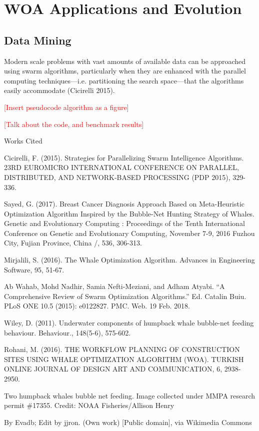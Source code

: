 \documentclass[11pt]{article}
\newcommand{\bibent}{\noindent \hangindent 40pt}
\newenvironment{workscited}{\newpage \begin{center} Works Cited \end{center}}{\newpage }
\newcommand{\TODO}[1]{\textcolor{red}{[#1]}}
\begin{document}
\section*{WOA Applications and Evolution}
\subsection*{Data Mining}
Modern scale problems with vast amounts of available data can be approached using swarm algorithms, particularly when they are enhanced with the parallel computing techniques---i.e. partitioning the search space---that the algorithms easily accommodate (Cicirelli 2015).

\TODO{Insert pseudocode algorithm as a figure}

\TODO{Talk about the code, and benchmark results}


\begin{workscited}

\bibent
Cicirelli, F. (2015). Strategies for Parallelizing Swarm Intelligence Algorithms. 23RD EUROMICRO INTERNATIONAL CONFERENCE ON PARALLEL, DISTRIBUTED, AND NETWORK-BASED PROCESSING (PDP 2015), 329-336.

\bibent
Sayed, G. (2017). Breast Cancer Diagnosis Approach Based on Meta-Heuristic Optimization Algorithm Inspired by the Bubble-Net Hunting Strategy of Whales. Genetic and Evolutionary Computing : Proceedings of the Tenth International Conference on Genetic and Evolutionary Computing, November 7-9, 2016 Fuzhou City, Fujian Province, China /, 536, 306-313.

\bibent
Mirjalili, S. (2016). The Whale Optimization Algorithm. Advances in Engineering Software, 95, 51-67.

\bibent
Ab Wahab, Mohd Nadhir, Samia Nefti-Meziani, and Adham Atyabi. “A Comprehensive Review of Swarm Optimization Algorithms.” Ed. Catalin Buiu. PLoS ONE 10.5 (2015): e0122827. PMC. Web. 19 Feb. 2018.

\bibent
Wiley, D. (2011). Underwater components of humpback whale bubble-net feeding behaviour. Behaviour., 148(5-6), 575-602.

\bibent
Rohani, M. (2016). THE WORKFLOW PLANNING OF CONSTRUCTION SITES USING WHALE OPTIMIZATION ALGORITHM (WOA). TURKISH ONLINE JOURNAL OF DESIGN ART AND COMMUNICATION, 6, 2938-2950.

\bibent %
Two humpback whales bubble net feeding. Image collected under MMPA research permit \#17355.
Credit: NOAA Fisheries/Allison Henry

\bibent %
By Evadb; Edit by jjron. (Own work) [Public domain], via Wikimedia Commons

\end{workscited}
\end{document}

